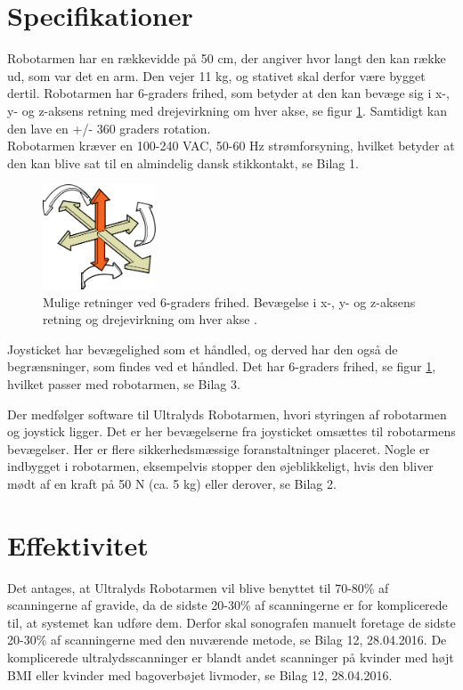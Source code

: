 \newpage
\section{Specifikationer}
Robotarmen har en rækkevidde på 50 cm, der angiver hvor langt den kan række ud, som var det en arm. Den vejer 11 kg, og stativet skal derfor være bygget dertil. Robotarmen har 6-graders frihed, som betyder at den kan bevæge sig i x-, y- og z-aksens retning med drejevirkning om hver akse, se figur \ref{seksgradersfrihed}. Samtidigt kan den lave en +/- 360 graders rotation. \\
Robotarmen kræver en 100-240 VAC, 50-60 Hz strømforsyning, hvilket betyder at den kan blive sat til en almindelig dansk stikkontakt, se Bilag 1.
\begin{figure}[H]\centering
	\includegraphics[width = 0.3\textwidth]{Figurer/sixDegressOfFreedom.jpg}
	\caption{Mulige retninger ved 6-graders frihed. Bevægelse i x-, y- og z-aksens retning og drejevirkning om hver akse \cite{6gradersfrihed}. }
	\label{seksgradersfrihed}
\end{figure}
Joysticket har bevægelighed som et håndled, og derved har den også de begrænsninger, som findes ved et håndled. Det har 6-graders frihed, se figur \ref{seksgradersfrihed}, hvilket passer med robotarmen, se Bilag 3. 

Der medfølger software til Ultralyds Robotarmen, hvori styringen af robotarmen og joystick ligger. Det er her bevægelserne fra joysticket omsættes til robotarmens bevægelser. Her er flere sikkerhedsmæssige foranstaltninger placeret. Nogle er indbygget i robotarmen, eksempelvis stopper den øjeblikkeligt, hvis den bliver mødt af en kraft på 50 N (ca. 5 kg) eller derover, se Bilag 2.    

\section{Effektivitet}
Det antages, at Ultralyds Robotarmen vil blive benyttet til 70-80\% af scanningerne af gravide, da de sidste 20-30\% af scanningerne er for komplicerede til, at systemet kan udføre dem. Derfor skal sonografen manuelt foretage de sidste 20-30\% af scanningerne med den nuværende metode, se Bilag 12, 28.04.2016. De komplicerede ultralydsscanninger er blandt andet scanninger på kvinder med højt BMI eller kvinder med bagoverbøjet livmoder, se Bilag 12, 28.04.2016. 
 

